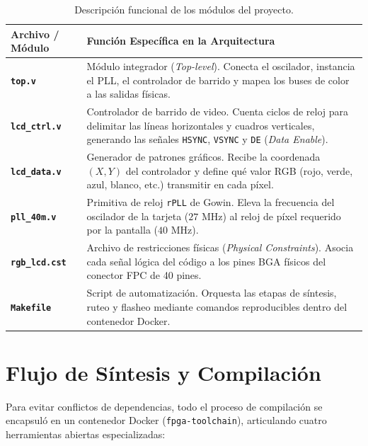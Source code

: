 \documentclass[12pt, letterpaper]{article}
\begin{document}
\begin{table}[H]
\centering
\small
\renewcommand{\arraystretch}{1.3}
\begin{tabularx}{\textwidth}{>{\columncolor{pastelYellow}}p{3.4cm} >{\columncolor{pastelGray}}X}
\toprule
\textbf{\color{brandBlue}Archivo / Módulo} & \textbf{\color{brandBlue}Función Específica en la Arquitectura} \\
\midrule
\textbf{\texttt{top.v}} & Módulo integrador (\textit{Top-level}). Conecta el oscilador, instancia el PLL, el controlador de barrido y mapea los buses de color a las salidas físicas. \\
\midrule
\textbf{\texttt{lcd\_ctrl.v}} & Controlador de barrido de video. Cuenta ciclos de reloj para delimitar las líneas horizontales y cuadros verticales, generando las señales \texttt{HSYNC}, \texttt{VSYNC} y \texttt{DE} (\textit{Data Enable}). \\
\midrule
\textbf{\texttt{lcd\_data.v}} & Generador de patrones gráficos. Recibe la coordenada $(X, Y)$ del controlador y define qué valor RGB (rojo, verde, azul, blanco, etc.) transmitir en cada píxel. \\
\midrule
\textbf{\texttt{pll\_40m.v}} & Primitiva de reloj \texttt{rPLL} de Gowin. Eleva la frecuencia del oscilador de la tarjeta ($27\text{ MHz}$) al reloj de píxel requerido por la pantalla ($40\text{ MHz}$). \\
\midrule
\textbf{\texttt{rgb\_lcd.cst}} & Archivo de restricciones físicas (\textit{Physical Constraints}). Asocia cada señal lógica del código a los pines BGA físicos del conector FPC de 40 pines. \\
\midrule
\textbf{\texttt{Makefile}} & Script de automatización. Orquesta las etapas de síntesis, ruteo y flasheo mediante comandos reproducibles dentro del contenedor Docker. \\
\bottomrule
\end{tabularx}
\caption{Descripción funcional de los módulos del proyecto.}
\label{tab:modulos}
\end{table}


\section{Flujo de Síntesis y Compilación}

Para evitar conflictos de dependencias, todo el proceso de compilación se encapsuló en un contenedor Docker (\texttt{fpga-toolchain}), articulando cuatro herramientas abiertas especializadas:
\end{document}
